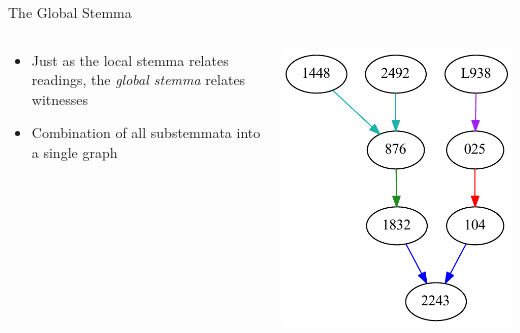 \documentclass[10pt]{beamer}
\begin{document}
	\begin{frame}{The Global Stemma}\label{slide:global-stemma}
		\begin{columns}
			\begin{column}{0.45\textwidth}
				\begin{itemize}
					\item Just as the local stemma relates readings, the \emph{global stemma} relates witnesses
					\item Combination of all substemmata into a single graph
				\end{itemize}
			\end{column}
			\begin{column}{0.45\textwidth}
				\begin{center}
					\includegraphics[width=\textwidth]{../graphics/partial-global-stemma.pdf}
				\end{center}
			\end{column}
		\end{columns}
	\end{frame}
\end{document}

